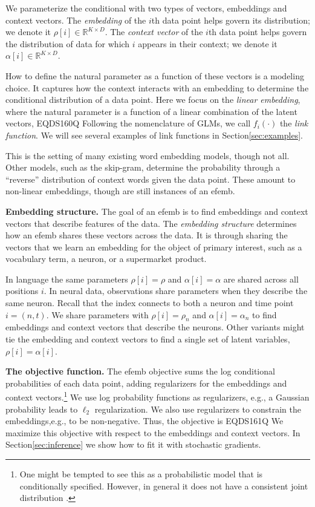 \documentclass[12pt]{article}
\DeclareRobustCommand{\parhead}[1]{\vspace{0.05in} \textbf{#1} }
\begin{document}
We parameterize the conditional with two types of vectors, embeddings
and context vectors. The \textit{embedding} of the $i$th data point
helps govern its distribution; we denote it
$\rho[i] \in \mathbb{R}^{K\times D}$. The \textit{context vector} of
the $i$th data point helps govern the distribution of data for which
$i$ appears in their context; we denote it
$\alpha[i] \in \mathbb{R}^{K\times D}$.

How to define the natural parameter as a function of these vectors is
a modeling choice. It captures how the context interacts with an
embedding to determine the conditional distribution of a data point.
Here we focus on the \textit{linear embedding}, where the natural
parameter is a function of a linear combination of the latent vectors,
EQDS160Q
Following the nomenclature of \glspl{GLM}, we call $f_i(\cdot)$ the
\textit{link function}.  We will see several examples of link
functions in Section\nobreakspace \ref {sec:examples}.

This is the setting of many existing word embedding models, though not
all. Other models, such as the skip-gram, determine the probability
through a ``reverse'' distribution of context words given the data
point. These amount to non-linear embeddings, though are still
instances of an \gls{efemb}.

\parhead{Embedding structure.} The goal of an \gls{efemb} is to find
embeddings and context vectors that describe features of the data. The
\textit{embedding structure} determines how an \gls{efemb} shares
these vectors across the data. It is through sharing the vectors that
we learn an embedding for the object of primary interest, such as a
vocabulary term, a neuron, or a supermarket product.

In language the same parameters $\rho[i] = \rho$ and
$\alpha[i] = \alpha$ are shared across all positions $i$. In neural
data, observations share parameters when they describe the same
neuron. Recall that the index connects to both a neuron and time point
$i=(n,t)$. We share parameters with $\rho[i] = \rho_n$ and
$\alpha[i] =\alpha_n$ to find embeddings and context vectors that
describe the neurons. Other variants might tie the embedding and
context vectors to find a single set of latent variables,
$\rho[i] = \alpha[i]$.

\parhead{The objective function.} The \gls{efemb} objective sums the
log conditional probabilities of each data point, adding regularizers
for the embeddings and context vectors.\footnote{One might be tempted
  to see this as a probabilistic model that is conditionally
  specified. However, in general it does not have a consistent joint
  distribution \citep{arnold2001conditionally}.}  We use log
probability functions as regularizers, e.g., a Gaussian probability
leads to $\ell_2$ regularization.  We also use regularizers to
constrain the embeddings,e.g., to be non-negative.  Thus, the
objective is
EQDS161Q
We maximize this objective with respect to the embeddings and context
vectors.  In Section\nobreakspace \ref {sec:inference} we show how to fit it with
stochastic gradients.
\end{document}
